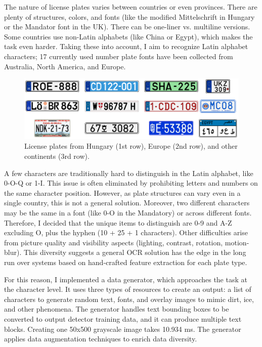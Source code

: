 The nature of license plates varies between countries or even provinces. There are plenty of structures, colors, and fonts (like the modified Mittelschrift in Hungary or the Mandator font in the UK). There can be one-liner vs. multiline versions. Some countries use non-Latin alphabets (like China or Egypt), which makes the task even harder. Taking these into account, I aim to recognize Latin alphabet characters; 17 currently used number plate fonts have been collected from Australia, North America, and Europe.

\begin{figure}[htb]
 \centerline{\includegraphics[width=1.0\columnwidth]{.//Figure/OCR/plates.png}}
 \caption{License plates from Hungary (1st row), Europe (2nd row), and other continents (3rd row).}
 \label{fig:simple}
\end{figure}

A few characters are traditionally hard to distinguish in the Latin alphabet, like 0-O-Q or 1-I. This issue is often eliminated by prohibiting letters and numbers on the same character position. However, as plate structures can vary even in a single country, this is not a general solution. Moreover, two different characters may be the same in a font (like 0-O in the Mandatory) or across different fonts. Therefore, I decided that the unique items to distinguish are 0-9 and A-Z excluding O, plus the hyphen (10 + 25 + 1 characters). Other difficulties arise from picture quality and visibility aspects (lighting, contrast, rotation, motion-blur). This diversity suggests a general OCR solution has the edge in the long run over systems based on hand-crafted feature extraction for each plate type.

For this reason, I implemented a data generator, which approaches the task at the character level. It uses three types of resources to create an output: a list of characters to generate random text, fonts, and overlay images to mimic dirt, ice, and other phenomena. The generator handles text bounding boxes to be converted to output detector training data, and it can produce multiple text blocks. Creating one 50x500 grayscale image takes 10.934 ms. The generator applies data augmentation techniques to enrich data diversity.

